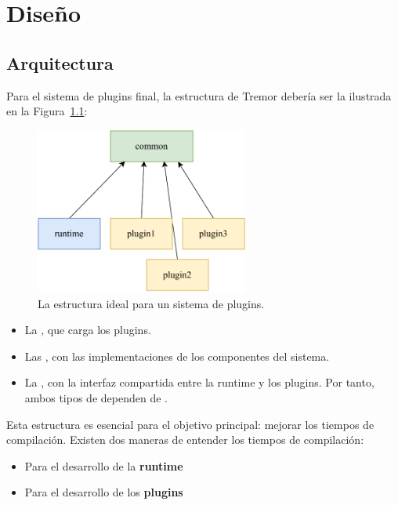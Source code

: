 
\chapter{Diseño}\label{sec:design}

\section{Arquitectura}

Para el sistema de plugins final, la estructura de Tremor debería ser la
ilustrada en la Figura~\ref{fig:separation}:

\begin{figure}
    \centering
    \includegraphics[width=7cm]{./Imagenes/separation.pdf}
    \caption{La estructura ideal para un sistema de plugins.}%
    \label{fig:separation}
\end{figure}

\begin{itemize}
    \item La \crate {}, que carga los plugins.

    \item Las \crates {}, con las implementaciones de los componentes
        del sistema.

    \item La \crate {}, con la interfaz compartida entre la runtime y
        los plugins. Por tanto, ambos tipos de \crate dependen de .

\end{itemize}

Esta estructura es esencial para el objetivo principal: mejorar los tiempos de
compilación. Existen dos maneras de entender los tiempos de compilación:

\begin{itemize}
    \item Para el desarrollo de la \textbf{runtime}

    \item Para el desarrollo de los \textbf{plugins}

\end{itemize}

